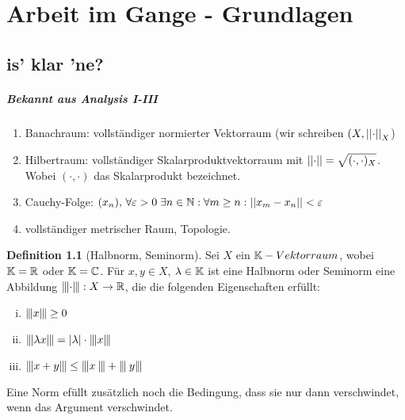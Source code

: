 \documentclass[ngerman]{report}
\theoremstyle{plain}%
\theoremstyle{definition}%
\newtheorem{definition}[thm]{Definition}
\theoremstyle{myStyle}
\begin{document}
\listoftodos
\tableofcontents
\listoftheorems

\chapter{Arbeit im Gange - Grundlagen}
\section{is' klar 'ne?}

\paragraph{Bekannt aus Analysis I-III}

\begin{enumerate}[-]
	\item Banachraum: vollständiger normierter Vektorraum (wir schreiben $(X,\left\lvert \left\lvert \cdot  \right\rvert \right\rvert_X$) 
	\item Hilbertraum: vollständiger Skalarproduktvektorraum mit $\left\lvert \left\lvert \cdot  \right\rvert \right\rvert = \sqrt{(\cdot , \cdot )_X}$.  Wobei $(\cdot , \cdot )$ das Skalarprodukt bezeichnet.
	\item Cauchy-Folge: 
					$(x_n),\,  \forall \varepsilon > 0\; \exists n \in \mathbb{N} : \forall m \geq n : \left\lvert \left\lvert x_m-x_n \right\rvert \right\rvert<\varepsilon$
	\item vollständiger metrischer Raum, Topologie.
\end{enumerate}

\begin{definition}[Halbnorm, Seminorm]

	Sei $X$ ein $\mathbb{K}-Vektorraum$, wobei $\mathbb{K} = \mathbb{R}$ oder $\mathbb{K} = \mathbb{C}$. 
	Für $x,y\in X$, $\lambda \in \mathbb{K}$ ist eine Halbnorm oder Seminorm eine Abbildung
	$\interleave{\cdot}\interleave:X \rightarrow \mathbb{R}$, die die folgenden Eigenschaften erfüllt:

		\begin{enumerate}[(i)]
			\item $\interleave{x}\interleave\geq 0$
			\item $\interleave{\lambda x}\interleave = |\lambda|\cdot \interleave{x}\interleave$
			\item $\interleave{x+y}\interleave \leq \interleave{x}\interleave + \interleave{y}\interleave$
		\end{enumerate}
\end{definition}

Eine Norm efüllt zusätzlich noch die Bedingung, dass sie nur dann verschwindet, wenn das Argument verschwindet.
\end{document}

